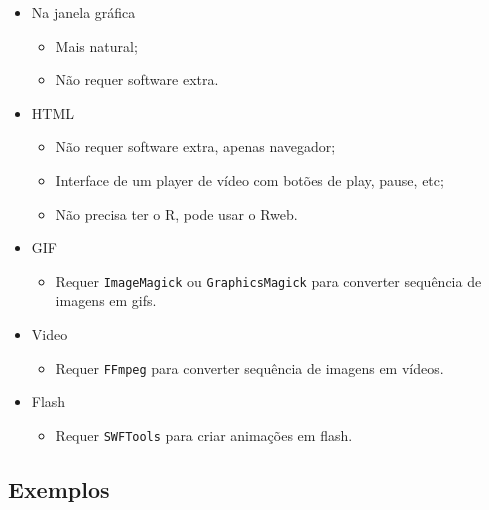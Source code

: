 \begin{frame}[allowframebreaks]
  \begin{multicols}{2}
    \begin{itemize}
    \item Na janela gráfica
      \begin{itemize}
      \item Mais natural;
      \item Não requer software extra.
      \end{itemize}
    \item HTML
      \begin{itemize}
      \item Não requer software extra, apenas navegador;
      \item Interface de um player de vídeo com botões de play, pause,
        etc;
      \item Não precisa ter o R, pode usar o Rweb.
      \end{itemize}
      \framebreak
    \item GIF
      \begin{itemize}
      \item Requer \texttt{ImageMagick} ou \texttt{GraphicsMagick} para
        converter sequência de imagens em gifs.
      \end{itemize}
    \item Video
      \begin{itemize}
      \item Requer \texttt{FFmpeg} para converter sequência de imagens
        em vídeos.
      \end{itemize}
    \item Flash
      \begin{itemize}
      \item Requer \texttt{SWFTools} para criar animações em flash.
      \end{itemize}
    \end{itemize}
  \end{multicols}
\end{frame}


\subsection{Exemplos}

